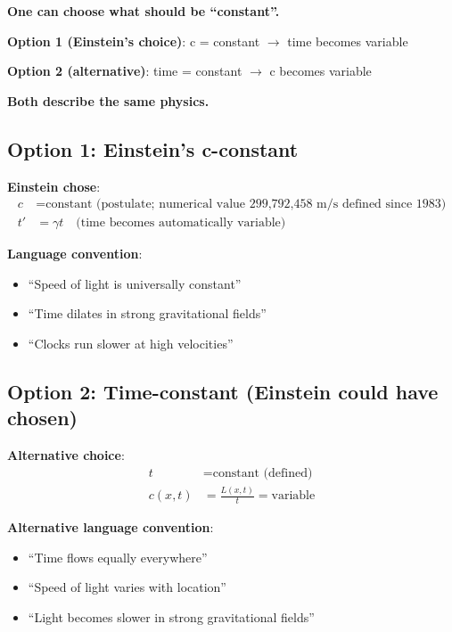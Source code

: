 	\begin{tcolorbox}[colback=orange!5!white,colframe=orange!75!black,title=The Fundamental Choice Option]
		\textbf{One can choose what should be ``constant''.}
		
		\textbf{Option 1 (Einstein's choice)}: c = constant $\rightarrow$ time becomes variable
		
		\textbf{Option 2 (alternative)}: time = constant $\rightarrow$ c becomes variable
		
		\textbf{Both describe the same physics.}
	\end{tcolorbox}
	
	\subsection{Option 1: Einstein's c-constant}
	
	\textbf{Einstein chose}:
	\begin{align}
		c &= \text{constant (postulate; numerical value 299,792,458 m/s defined since 1983)} \\
		t' &= \gamma t \quad \text{(time becomes automatically variable)}
	\end{align}
	
	\textbf{Language convention}:
	\begin{itemize}
		\item ``Speed of light is universally constant''
		\item ``Time dilates in strong gravitational fields''
		\item ``Clocks run slower at high velocities''
	\end{itemize}
	
	\subsection{Option 2: Time-constant (Einstein could have chosen)}
	
	\textbf{Alternative choice}:
	\begin{align}
		t &= \text{constant (defined)} \\
		c(x,t) &= \frac{L(x,t)}{t} = \text{variable}
	\end{align}
	
	\textbf{Alternative language convention}:
	\begin{itemize}
		\item ``Time flows equally everywhere''
		\item ``Speed of light varies with location''
		\item ``Light becomes slower in strong gravitational fields''
	\end{itemize}
	
